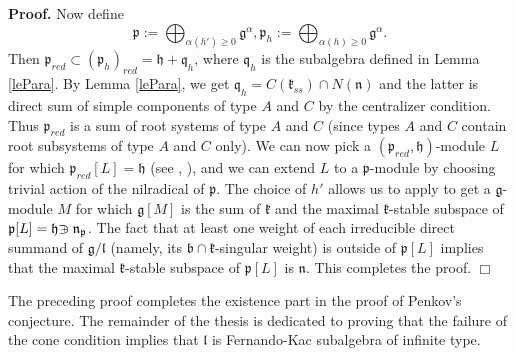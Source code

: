 \documentclass[12pt]{report}
\newenvironment{proof}[1][]{ \textbf{Proof#1. }}{$\Box$\medskip}
\newcommand{\kk}{\mathfrak{k}}
\newcommand{\nn}{\mathfrak{n}}
\newcommand{\hh}{\mathfrak{h}}
\newcommand{\qq}{\mathfrak{q}}
\newcommand{\pp}{\mathfrak{p}}
\newcommand{\gG}{\mathfrak{g}}
\newcommand{\bb}{\mathfrak{b}}
\newcommand{\lL}{\mathfrak{l}}
\newcommand{\refle}[1]{Lemma \ref{#1}}
\def\crplus{\hbox{$\supset${\raise1.05pt\hbox{\kern -0.60em ${\scriptscriptstyle +}$}}\ }}
\begin{document}
\begin{proof}
Now define 
\[
\pp:=\bigoplus_{\alpha(h')\geq 0}\gG^{\alpha}, \pp_h:=\bigoplus_{\alpha(h)\geq 0}\gG^{\alpha}.
\]
Then $\pp_{red}\subset{(\pp_h)}_{red}=\hh+\qq_h$, where $\qq_h$ is the subalgebra defined in \refle{lePara}. By \refle{lePara}, we get ${\qq_h}=C(\kk_{ss})\cap N(\nn)$ and the latter is direct sum of simple components of type $A$ and $C$ by the centralizer condition. Thus $\pp_{red}$ is a sum of root systems of type $A$ and $C$ (since types $A$ and $C$ contain root subsystems of type $A$ and $C$ only). We can now pick a $(\pp_{ red} , \hh)$-module $L$  for which $\pp_{red}[L]=\hh$ (see \cite{BrittenLemire}, \cite[Sections 8,9]{Mathieu}), and we can extend $L$ to a $\pp$-module by choosing trivial action of the nilradical of $\pp$. The choice of $h'$ allows us to apply \cite[Theorem 4.3]{PSZ} to get a $\gG$-module $M$ for which $\gG[M]$ is the sum of $\kk$ and the maximal $\kk$-stable subspace of $\pp[L]=\hh\crplus\nn_\pp$. The fact that at least one weight of each irreducible direct summand of $\gG/\lL$ (namely, its $\bb\cap\kk$-singular weight) is outside of $\pp[L]$ implies that the maximal $\kk$-stable subspace of $\pp[L]$ is $\nn$. This completes the proof.
\end{proof}


The preceding proof completes the existence part in the proof of Penkov's conjecture. The remainder of the thesis is dedicated to proving that the failure of the cone condition implies that $\lL$ is Fernando-Kac subalgebra of infinite type.
\end{document}
